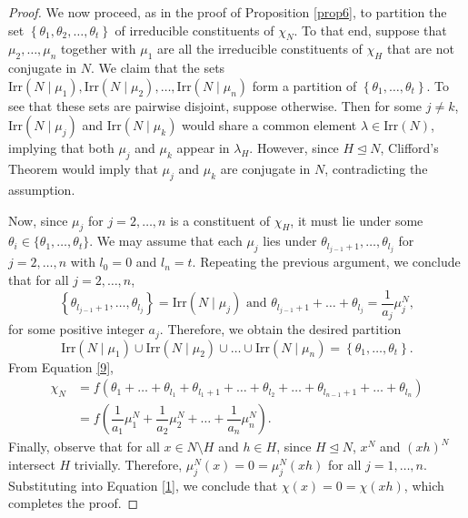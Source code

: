 \documentclass[twoside,a4paper,reqno,11pt]{amsart}
\newcommand{\<}{\langle}
\renewcommand{\>}{\rangle}
\newcommand{\Irr}{\mathrm {Irr}}
\renewcommand{\:}{\colon}
\theoremstyle{definition}
\begin{document}
\begin{proof}
	We now proceed, as in the proof of  Proposition \ref{prop6}, to partition   the set $\left\{\theta_1,\theta_2,\ldots,\theta_t\right\}$ of irreducible constituents  of $\chi_N$. To that end, suppose that  $\mu_2,\ldots,\mu_n$ together with $\mu_1$ are all the irreducible constituents of $\chi_H$ that are not conjugate in $N$. We claim that  the sets $\Irr(N\mid \mu_1),\Irr(N\mid\mu_2),\ldots,\Irr(N\mid \mu_n)$ form a partition of $\left\{\theta_1,\ldots,\theta_t\right\}$. To see that these sets are pairwise disjoint, suppose otherwise. Then for some $j\neq k$, $\Irr(N\mid\mu_j)$ and $\Irr(N\mid \mu_k)$ would share a common element $\lambda\in\Irr(N)$, implying that both $\mu_j$ and $\mu_k$ appear in $\lambda_H$. However, since $H\unlhd N$, Clifford's Theorem would imply that $\mu_j$ and $\mu_k$ are conjugate in $N$, contradicting the assumption. 
	
	Now, since $\mu_j$ for $j=2,\ldots,n$ is a constituent of $\chi_H$, it must  lie under some $\theta_i\in \{\theta_1,\dots,\theta_t\}$. We may assume  that each $\mu_j$ lies under $\theta_{l_{j-1}+1},\ldots,\theta_{l_{j}}$ for $j=2,\ldots,n$ with $l_0=0$ and ${l_n} = t$. Repeating the previous argument, we conclude that for all $j=2,\ldots,n$, $$\left\{\theta_{l_{j-1}+1},\ldots,\theta_{l_j}\right\} = \Irr(N\mid \mu_j)\text{ and }
	\theta_{l_{j-1}+1} + \ldots + \theta_{l_j} = \dfrac{1}{a_j}\mu_j^N,$$
	for some positive integer $a_j$. Therefore, we obtain the desired partition $$\Irr(N\mid \mu_1)\cup \Irr(N\mid \mu_2)\cup \ldots\cup\Irr(N\mid\mu_n)=\left\{\theta_1,\ldots,\theta_t\right\}.$$ From Equation \eqref{9}, 
	 	\begin{align}\label{1}
		\chi_N &= f (\theta_1+ \ldots +\theta_{l_1} + \theta_{l_1+1}+\ldots + \theta_{l_2} + \ldots + \theta_{l_{n-1}+1} + \ldots +\theta_{l_n}) \nonumber\\
		& = f\left(\dfrac{1}{a_1}\mu_1^N + \dfrac{1}{a_2}\mu_2^N  + \ldots + \dfrac{1}{a_n}\mu_n^N\right).
	\end{align} 
	Finally, observe that for all  $x\in N\setminus H$ and  $h\in H$, since $H\unlhd N$, $x^N$ and $(xh)^N$ intersect $H$ trivially. Therefore, $\mu_j^N(x) = 0 = \mu_j^N(xh)$  for all $j=1,\ldots,n$. Substituting into Equation \eqref{1}, we conclude that $\chi(x) = 0=\chi(xh)$, which completes the proof. 
\end{proof}
\end{document}
